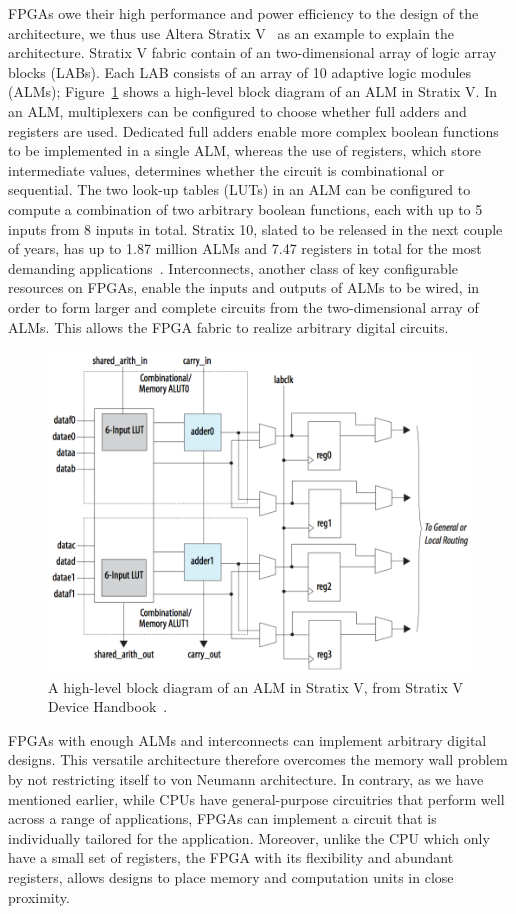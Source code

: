 FPGAs owe their high performance and power efficiency to the design of the
architecture, we thus use Altera Stratix V~\cite{stratix5} as an example to
explain the architecture.  Stratix V fabric contain of an two-dimensional array
of logic array blocks (LABs).  Each LAB consists of an array of 10 adaptive
logic modules (ALMs); Figure~\ref{bg:fig:alm} shows a high-level block diagram
of an ALM in Stratix V.  In an ALM, multiplexers can be configured to choose
whether full adders and registers are used.  Dedicated full adders enable more
complex boolean functions to be implemented in a single ALM, whereas the use of
registers, which store intermediate values, determines whether the circuit is
combinational or sequential.  The two look-up tables (LUTs) in an ALM can be
configured to compute a combination of two arbitrary boolean functions, each
with up to 5 inputs from 8 inputs in total.  Stratix 10, slated to be released
in the next couple of years, has up to 1.87 million ALMs and 7.47 registers in
total for the most demanding applications~\cite{stratix10stat}.  Interconnects,
another class of key configurable resources on FPGAs, enable the inputs and
outputs of ALMs to be wired, in order to form larger and complete circuits from
the two-dimensional array of ALMs.  This allows the FPGA fabric to realize
arbitrary digital circuits.
\begin{figure}[ht]
    \centering
    \includegraphics[width=0.8\linewidth]{bg/fig/alm.png}
    \caption{%
        A high-level block diagram of an ALM in Stratix V, from Stratix V
        Device Handbook~\cite{stratix5}.
    }\label{bg:fig:alm}
\end{figure}


FPGAs with enough ALMs and interconnects can implement arbitrary digital
designs.  This versatile architecture therefore overcomes the memory wall
problem by not restricting itself to von Neumann architecture.  In contrary,
as we have mentioned earlier, while CPUs have general-purpose circuitries that
perform well across a range of applications, FPGAs can implement a circuit that
is individually tailored for the application.  Moreover, unlike the CPU which
only have a small set of registers, the FPGA with its flexibility and abundant
registers, allows designs to place memory and computation units in close
proximity.

